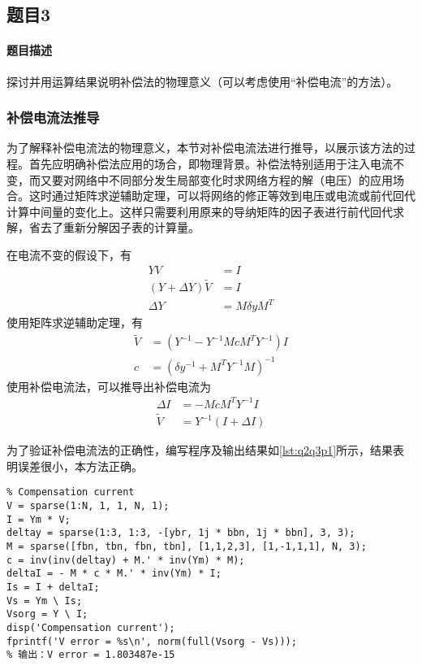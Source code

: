 \documentclass[a4paper,12pt]{article}
\begin{document}
    \subsection{题目3}
    \paragraph{题目描述} 探讨并用运算结果说明补偿法的物理意义（可以考虑使用“补偿电流”的方法）。
    \subsubsection{补偿电流法推导}
    为了解释补偿电流法的物理意义，本节对补偿电流法进行推导，以展示该方法的过程。首先应明确补偿法应用的场合，即物理背景。补偿法特别适用于注入电流不变，而又要对网络中不同部分发生局部变化时求网络方程的解（电压）的应用场合。这时通过矩阵求逆辅助定理，可以将网络的修正等效到电压或电流或前代回代计算中间量的变化上。这样只需要利用原来的导纳矩阵的因子表进行前代回代求解，省去了重新分解因子表的计算量。

    在电流不变的假设下，有
    \begin{equation}
      \begin{aligned}
        YV&=I\\
        (Y+\Delta Y)\widetilde V&=I\\
        \Delta Y&=M\delta y M^T
      \end{aligned}
    \end{equation}
    使用矩阵求逆辅助定理，有
    \begin{equation}
      \begin{aligned}
        \widetilde V&=(Y^{-1}-Y^{-1}McM^TY^{-1})I\\
        c&=(\delta y^{-1}+M^TY^{-1}M)^{-1}
      \end{aligned}
    \end{equation}
    使用补偿电流法，可以推导出补偿电流为
    \begin{equation}
      \begin{aligned}
        \Delta I&=-McM^TY^{-1}I\\
        \widetilde V&=Y^{-1}(I+\Delta I)
      \end{aligned}
    \end{equation}

    为了验证补偿电流法的正确性，编写程序及输出结果如\cref{lst:q2q3p1}所示，结果表明误差很小，本方法正确。
    \begin{lstlisting}[style=Matlab-editor,basicstyle=\mlttfamily,label=lst:q2q3p1,caption={补偿电流法}]
%% Compensation method
% Compensation current
V = sparse(1:N, 1, 1, N, 1);
I = Ym * V;
deltay = sparse(1:3, 1:3, -[ybr, 1j * bbn, 1j * bbn], 3, 3);
M = sparse([fbn, tbn, fbn, tbn], [1,1,2,3], [1,-1,1,1], N, 3);
c = inv(inv(deltay) + M.' * inv(Ym) * M);
deltaI = - M * c * M.' * inv(Ym) * I;
Is = I + deltaI;
Vs = Ym \ Is;
Vsorg = Y \ I;
disp('Compensation current');
fprintf('V error = %s\n', norm(full(Vsorg - Vs)));
% 输出：V error = 1.803487e-15
    \end{lstlisting}
\end{document}
